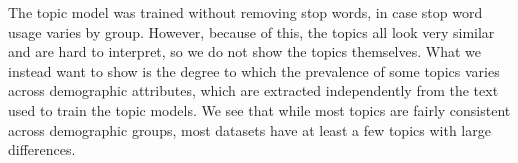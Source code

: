 The topic model was trained without removing stop words, in case stop word usage varies by group.
However, because of this, the topics all look very similar and are hard to interpret, so we do not show the topics themselves.
What we instead want to show is the degree to which the prevalence of some topics varies across demographic attributes, which are extracted independently from the text used to train the topic models.
We see that while most topics are fairly consistent across demographic groups, most datasets have at least a few topics with large differences.







%

%

%

%

